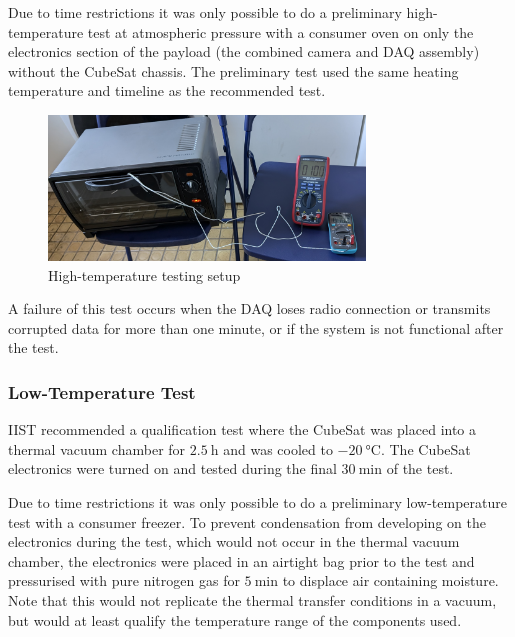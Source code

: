 \documentclass{report}
\begin{document}
Due to time restrictions it was only possible to do a preliminary high-temperature test at atmospheric pressure with a consumer oven on only the electronics section of the payload (the combined camera and DAQ assembly) without the CubeSat chassis. The preliminary test used the same heating temperature and timeline as the recommended test.

\begin{figure}[H]
  \centering
  \includegraphics[width=0.75\textwidth]{images/oven_test.jpg}
  \caption{High-temperature testing setup}
\end{figure}

A failure of this test occurs when the DAQ loses radio connection or transmits corrupted data for more than one minute, or if the system is not functional after the test.

\subsubsection{Low-Temperature Test}
\label{sec:ltemp-test-framework}
IIST recommended a qualification test where the CubeSat was placed into a thermal vacuum chamber for $\SI{2.5}{\hour}$ and was cooled to $\SI{-20}{\degreeCelsius}$. The CubeSat electronics were turned on and tested during the final $\SI{30}{\minute}$ of the test.

Due to time restrictions it was only possible to do a preliminary low-temperature test with a consumer freezer. To prevent condensation from developing on the electronics during the test, which would not occur in the thermal vacuum chamber, the electronics were placed in an airtight bag prior to the test and pressurised with pure nitrogen gas for $\SI{5}{\minute}$ to displace air containing moisture. Note that this would not replicate the thermal transfer conditions in a vacuum, but would at least qualify the temperature range of the components used.
\end{document}
